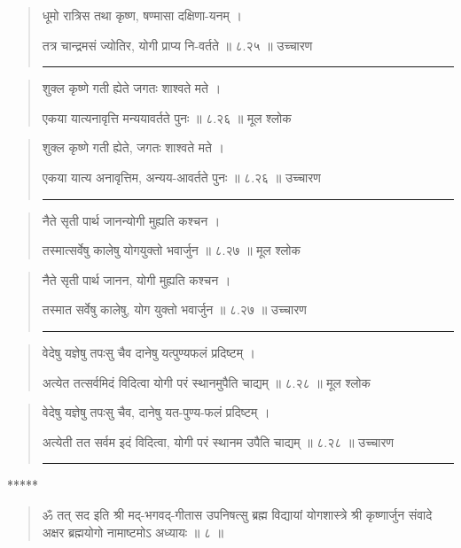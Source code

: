 \begin{quotation}

धूमो रात्रिस तथा कृष्ण, षण्मासा दक्षिणा-यनम्‌  ।  

तत्र चान्द्रमसं ज्योतिर, योगी प्राप्य नि-वर्तते  ॥ ८.२५ ॥  उच्चारण

\noindent\rule{16cm}{0.4pt} 
\end{quotation}


\begin{quotation} 

शुक्ल कृष्णे गती ह्येते जगतः शाश्वते मते  ।  

एकया यात्यनावृत्ति मन्ययावर्तते पुनः  ॥ ८.२६ ॥  मूल श्लोक
\end{quotation}

\begin{quotation}

शुक्ल कृष्णे गती ह्येते, जगतः शाश्वते मते  ।  

एकया यात्य अनावृत्तिम, अन्यय-आवर्तते पुनः  ॥ ८.२६ ॥  उच्चारण

\noindent\rule{16cm}{0.4pt} 
\end{quotation}


\begin{quotation} 

नैते सृती पार्थ जानन्योगी मुह्यति कश्चन  ।  

तस्मात्सर्वेषु कालेषु योगयुक्तो भवार्जुन  ॥ ८.२७ ॥  मूल श्लोक
\end{quotation}

\begin{quotation}
नैते सृती पार्थ जानन, योगी मुह्यति कश्चन  ।  

तस्मात सर्वेषु कालेषु, योग युक्तो भवार्जुन  ॥ ८.२७ ॥  उच्चारण

\noindent\rule{16cm}{0.4pt} 
\end{quotation}


\begin{quotation} 

वेदेषु यज्ञेषु तपःसु चैव दानेषु यत्पुण्यफलं प्रदिष्टम्‌  ।  

अत्येत तत्सर्वमिदं विदित्वा योगी परं स्थानमुपैति चाद्यम्‌  ॥ ८.२८ ॥  मूल श्लोक
\end{quotation}

\begin{quotation}

वेदेषु यज्ञेषु तपःसु चैव, 
दानेषु यत-पुण्य-फलं प्रदिष्टम्‌  ।  

अत्येती तत सर्वम इदं विदित्वा, 
योगी परं स्थानम उपैति चाद्यम्‌  ॥ ८.२८ ॥  उच्चारण

\noindent\rule{16cm}{0.4pt} 
\end{quotation}

\begin{center} ***** \end{center}

\begin{quotation} 





ॐ तत् सद इति श्री मद्-भगवद्-गीतास उपनिषत्सु ब्रह्म विद्यायां योगशास्त्रे श्री कृष्णार्जुन संवादे अक्षर ब्रह्मयोगो नामाष्टमोऽ अध्यायः  ॥  ८ ॥ 

\end{quotation}



